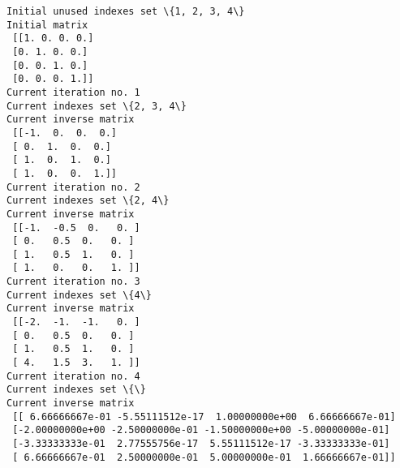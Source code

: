 \documentclass[11pt]{article}
\begin{document}
    \begin{Verbatim}[commandchars=\\\{\}]
Initial unused indexes set \{1, 2, 3, 4\}
Initial matrix
 [[1. 0. 0. 0.]
 [0. 1. 0. 0.]
 [0. 0. 1. 0.]
 [0. 0. 0. 1.]]
Current iteration no. 1
Current indexes set \{2, 3, 4\}
Current inverse matrix
 [[-1.  0.  0.  0.]
 [ 0.  1.  0.  0.]
 [ 1.  0.  1.  0.]
 [ 1.  0.  0.  1.]]
Current iteration no. 2
Current indexes set \{2, 4\}
Current inverse matrix
 [[-1.  -0.5  0.   0. ]
 [ 0.   0.5  0.   0. ]
 [ 1.   0.5  1.   0. ]
 [ 1.   0.   0.   1. ]]
Current iteration no. 3
Current indexes set \{4\}
Current inverse matrix
 [[-2.  -1.  -1.   0. ]
 [ 0.   0.5  0.   0. ]
 [ 1.   0.5  1.   0. ]
 [ 4.   1.5  3.   1. ]]
Current iteration no. 4
Current indexes set \{\}
Current inverse matrix
 [[ 6.66666667e-01 -5.55111512e-17  1.00000000e+00  6.66666667e-01]
 [-2.00000000e+00 -2.50000000e-01 -1.50000000e+00 -5.00000000e-01]
 [-3.33333333e-01  2.77555756e-17  5.55111512e-17 -3.33333333e-01]
 [ 6.66666667e-01  2.50000000e-01  5.00000000e-01  1.66666667e-01]]
    \end{Verbatim}


    
    
    
\end{document}
